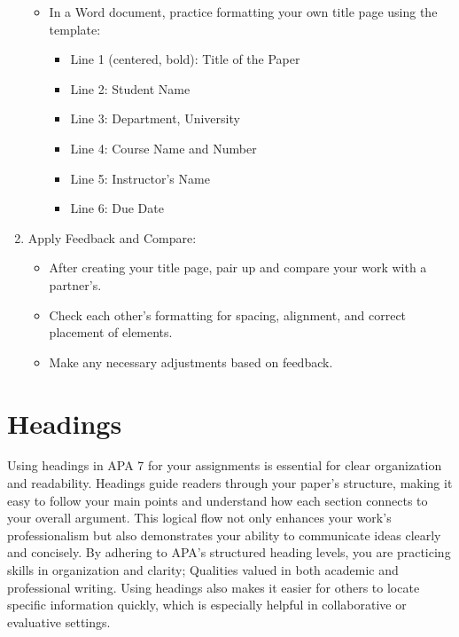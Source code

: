 \documentclass[
  letterpaper,
  DIV=11,
  numbers=noendperiod]{scrreprt}
\providecommand{\tightlist}{%
  \setlength{\itemsep}{0pt}\setlength{\parskip}{0pt}}\usepackage{longtable,booktabs,array}
\begin{document}
\begin{enumerate}
  \begin{itemize}
  \tightlist
  \item
    In a Word document, practice formatting your own title page using
    the template:

    \begin{itemize}
    \tightlist
    \item
      Line 1 (centered, bold): Title of the Paper
    \item
      Line 2: Student Name
    \item
      Line 3: Department, University
    \item
      Line 4: Course Name and Number
    \item
      Line 5: Instructor's Name
    \item
      Line 6: Due Date
    \end{itemize}
  \end{itemize}
\item
  Apply Feedback and Compare:

  \begin{itemize}
  \tightlist
  \item
    After creating your title page, pair up and compare your work with a
    partner's.
  \item
    Check each other's formatting for spacing, alignment, and correct
    placement of elements.
  \item
    Make any necessary adjustments based on feedback.
  \end{itemize}
\end{enumerate}


\chapter*{}\label{section-10}

\markboth{}{}


\chapter*{Headings}\label{headings}


Using headings in APA 7 for your assignments is essential for clear
organization and readability. Headings guide readers through your
paper's structure, making it easy to follow your main points and
understand how each section connects to your overall argument. This
logical flow not only enhances your work's professionalism but also
demonstrates your ability to communicate ideas clearly and concisely. By
adhering to APA's structured heading levels, you are practicing skills
in organization and clarity; Qualities valued in both academic and
professional writing. Using headings also makes it easier for others to
locate specific information quickly, which is especially helpful in
collaborative or evaluative settings.
\end{document}
